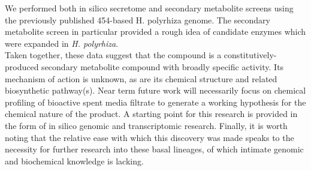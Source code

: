 \indent We performed both in silico secretome and secondary metabolite screens using the previously published 454-based H. polyrhiza genome. The secondary metabolite screen in particular provided a rough idea of candidate enzymes which were expanded in \textit{H. polyrhiza}.\\
\indent Taken together, these data suggest that the compound is a constitutively-produced secondary metabolite compound with broadly specific activity. Its mechanism of action is unknown, as are its chemical structure and related biosynthetic pathway(s). Near term future work will necessarily focus on chemical profiling of bioactive spent media filtrate to generate a working hypothesis for the chemical nature of the product. A starting point for this research is provided in the form of in silico genomic and transcriptomic research. Finally, it is worth noting that the relative ease with which this discovery was made speaks to the necessity for further research into these basal lineages, of which intimate genomic and biochemical knowledge is lacking.

